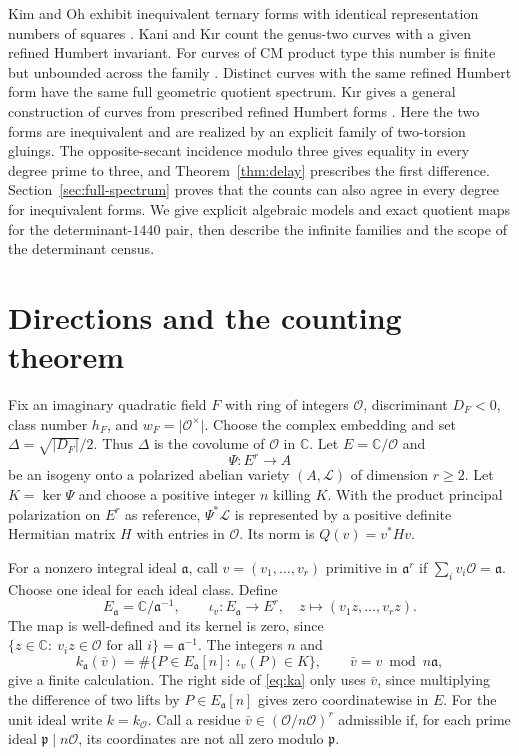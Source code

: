 \documentclass[11pt,letterpaper]{amsart}
\theoremstyle{definition}
\numberwithin{equation}{section}
\newcommand{\C}{\mathbb C}
\newcommand{\OO}{\mathcal O}
\newcommand{\abs}[1]{\lvert #1\rvert}
\begin{document}
Kim and Oh exhibit inequivalent ternary forms with identical
representation numbers of squares \cite{KimOh}. Kani and K\i r count the
genus-two curves with a given refined Humbert invariant. For curves of
CM product type this number is finite but unbounded across the family
\cite{KaniKir}. Distinct curves with the same refined Humbert form have
the same full geometric quotient spectrum. K\i r gives a general
construction of curves from prescribed refined Humbert forms
\cite{KirConstruction}. Here the two forms are inequivalent and are
realized by an explicit family of two-torsion gluings. The opposite-secant
incidence modulo three gives equality in every degree prime to three,
and Theorem~\ref{thm:delay} prescribes the first difference.
Section~\ref{sec:full-spectrum} proves that the counts can also agree
in every degree for inequivalent forms. We give explicit algebraic
models and exact quotient maps for the determinant-\(1440\) pair, then
describe the infinite families and the scope of the determinant census.

\section{Directions and the counting theorem}

Fix an imaginary quadratic field \(F\) with ring of integers \(\OO\),
discriminant \(D_F<0\), class number \(h_F\), and \(w_F=\abs{\OO^\times}\).
Choose the complex embedding and set \(\Delta=\sqrt{\abs{D_F}}/2\).
Thus \(\Delta\) is the covolume of \(\OO\) in \(\C\).
Let \(E=\C/\OO\) and
\[
  \Psi:E^r\longrightarrow A
\]
be an isogeny onto a polarized abelian variety \((A,\mathcal L)\) of
dimension \(r\ge2\). Let \(K=\ker\Psi\) and choose a positive integer
\(n\) killing \(K\). With the product principal polarization on \(E^r\)
as reference, \(\Psi^*\mathcal L\) is represented by a positive
definite Hermitian matrix \(H\) with entries in \(\OO\). Its norm is
\(Q(v)=v^*Hv\).

For a nonzero integral ideal \(\mathfrak a\), call \(v=(v_1,\dots,v_r)\)
primitive in \(\mathfrak a^r\) if \(\sum_i v_i\OO=\mathfrak a\).
Choose one ideal for each ideal class. Define
\[
 E_{\mathfrak a}=\C/\mathfrak a^{-1},\qquad
 \iota_v:E_{\mathfrak a}\longrightarrow E^r,\quad
 z\longmapsto(v_1z,\ldots,v_rz).
\]
The map is well-defined and its kernel is zero, since
\(\{z\in\C:\ v_i z\in\OO\text{ for all }i\}=\mathfrak a^{-1}\).
The integers \(n\) and
\begin{equation}\label{eq:ka}
 k_{\mathfrak a}(\bar v)=
 \#\{P\in E_{\mathfrak a}[n]:\ \iota_v(P)\in K\},
 \qquad \bar v=v\bmod n\mathfrak a ,
\end{equation}
give a finite calculation. The right side of \eqref{eq:ka} only uses
\(\bar v\), since multiplying the difference of two lifts by
\(P\in E_{\mathfrak a}[n]\) gives zero coordinatewise in \(E\).
For the unit ideal write \(k=k_{\OO}\). Call a residue
\(\bar v\in(\OO/n\OO)^r\) admissible if, for each prime ideal
\(\mathfrak p\mid n\OO\), its coordinates are not all zero modulo
\(\mathfrak p\).
\end{document}
